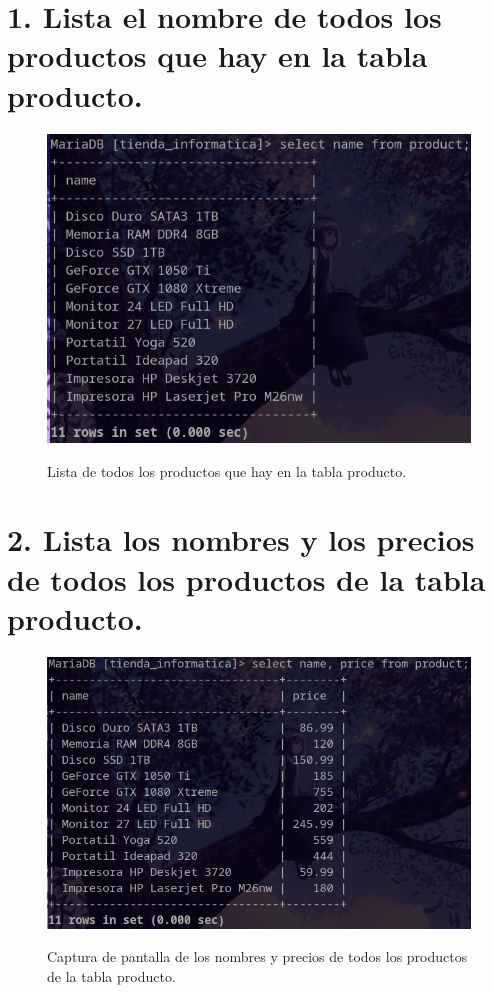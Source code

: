 \documentclass{article}
\begin{document}
\newpage %

\section*{1. Lista el nombre de todos los productos que hay en la tabla producto.}


\begin{figure}[ht]
    \centering
    {
        \includegraphics[width=\linewidth]{01screenshot.png} %
    }
    \caption{Lista de todos los productos que hay en la tabla producto.}
\end{figure}

\newpage %

\section*{2. Lista los nombres y los precios de todos los productos de la tabla producto.}

\begin{figure}[ht]
    \centering
    {
        \includegraphics[width=\linewidth]{02screenshot.png} %
    }
    \caption{Captura de pantalla de los nombres y precios de todos los productos de la tabla producto.}
\end{figure}
\end{document}
